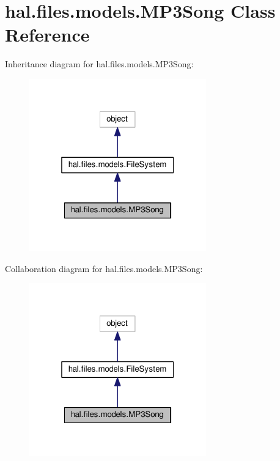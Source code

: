 \hypertarget{classhal_1_1files_1_1models_1_1_m_p3_song}{}\section{hal.\+files.\+models.\+M\+P3\+Song Class Reference}
\label{classhal_1_1files_1_1models_1_1_m_p3_song}


Inheritance diagram for hal.\+files.\+models.\+M\+P3\+Song\+:
\nopagebreak
\begin{figure}[H]
\begin{center}
\leavevmode
\includegraphics[width=217pt]{classhal_1_1files_1_1models_1_1_m_p3_song__inherit__graph}
\end{center}
\end{figure}


Collaboration diagram for hal.\+files.\+models.\+M\+P3\+Song\+:
\nopagebreak
\begin{figure}[H]
\begin{center}
\leavevmode
\includegraphics[width=217pt]{classhal_1_1files_1_1models_1_1_m_p3_song__coll__graph}
\end{center}
\end{figure}
